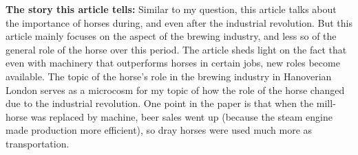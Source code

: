 

\textbf{The story this article tells:} Similar to my question, this article talks about the importance of horses during, and even after the industrial revolution.  But this article mainly focuses on the aspect of the brewing industry, and less so of the general role of the horse over this period.  The article sheds light on the fact that even with machinery that outperforms horses in certain jobs, new roles become available.  The topic of the horse's role in the brewing industry in Hanoverian London serves as a microcosm for my topic of how the role of the horse changed due to the industrial revolution.  One point in the paper is that when the mill-horse was replaced by machine, beer sales went up (because the steam engine made production more efficient), so dray horses were used much more as transportation.